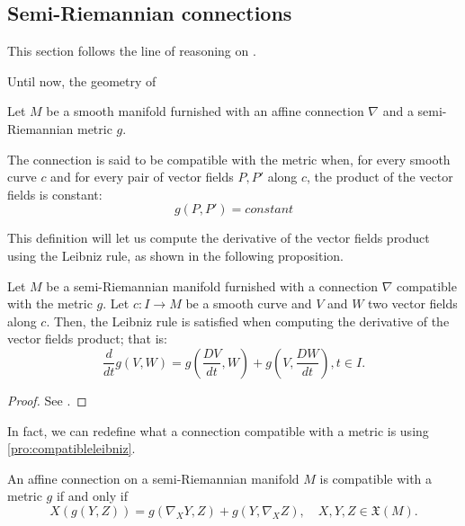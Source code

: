 \subsection{Semi-Riemannian connections}

This section follows the line of reasoning on \cite[Ch. 2, Section 3]{docarmo79}.

Until now, the geometry of 

\begin{definition}
	Let $M$ be a smooth manifold furnished with an affine connection $\nabla$ and a semi-Riemannian metric $g$.
	
	The connection is said to be compatible with the metric when, for every smooth curve $c$ and for every pair of vector fields $P, P'$ along $c$, the product of the vector fields is constant:
	\[
		g(P, P') = constant
	\]
\end{definition}

This definition will let us compute the derivative of the vector fields product using the Leibniz rule, as shown in the following proposition.

\begin{proposition}
	\label{pro:compatibleleibniz}
	Let $M$ be a semi-Riemannian manifold furnished with a connection $\nabla$ compatible with the metric $g$. Let $c \colon I \to M$ be a smooth curve and $V$ and $W$ two vector fields along $c$. Then, the Leibniz rule is satisfied when computing the derivative of the vector fields product; that is:
	\[
		\frac{d}{dt}g(V,W) = g(\frac{DV}{dt}, W) + g(V, \frac{DW}{dt}), t \in I.
	\]
\end{proposition}

\begin{proof}
	See \cite[Ch. 2, Section 3, Proposition 3.2]{docarmo79}.
\end{proof}

In fact, we can redefine what a connection compatible with a metric is using \autoref{pro:compatibleleibniz}.

\begin{corollary}
	An affine connection on a semi-Riemannian manifold $M$ is compatible with a metric $g$ if and only if
	\[
		X(g(Y,Z)) = g(\nabla_X Y, Z) + g(Y, \nabla_X Z), \quad X, Y, Z \in \mathfrak{X}(M).
	\]
\end{corollary}

